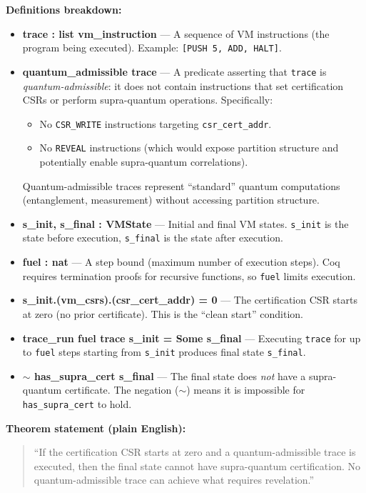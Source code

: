\textbf{Definitions breakdown:}
\begin{itemize}
    \item \textbf{trace : list vm\_instruction} — A sequence of VM instructions (the program being executed). Example: \texttt{[PUSH 5, ADD, HALT]}.

    \item \textbf{quantum\_admissible trace} — A predicate asserting that \texttt{trace} is \textit{quantum-admissible}: it does not contain instructions that set certification CSRs or perform supra-quantum operations. Specifically:
    \begin{itemize}
        \item No \texttt{CSR\_WRITE} instructions targeting \texttt{csr\_cert\_addr}.
        \item No \texttt{REVEAL} instructions (which would expose partition structure and potentially enable supra-quantum correlations).
    \end{itemize}
    Quantum-admissible traces represent ``standard'' quantum computations (entanglement, measurement) without accessing partition structure.

    \item \textbf{s\_init, s\_final : VMState} — Initial and final VM states. \texttt{s\_init} is the state before execution, \texttt{s\_final} is the state after execution.

    \item \textbf{fuel : nat} — A step bound (maximum number of execution steps). Coq requires termination proofs for recursive functions, so \texttt{fuel} limits execution.

    \item \textbf{s\_init.(vm\_csrs).(csr\_cert\_addr) = 0} — The certification CSR starts at zero (no prior certificate). This is the ``clean start'' condition.

    \item \textbf{trace\_run fuel trace s\_init = Some s\_final} — Executing \texttt{trace} for up to \texttt{fuel} steps starting from \texttt{s\_init} produces final state \texttt{s\_final}.

    \item \textbf{$\sim$ has\_supra\_cert s\_final} — The final state does \textit{not} have a supra-quantum certificate. The negation ($\sim$) means it is impossible for \texttt{has\_supra\_cert} to hold.
\end{itemize}

\textbf{Theorem statement (plain English):}
\begin{quote}
``If the certification CSR starts at zero and a quantum-admissible trace is executed, then the final state cannot have supra-quantum certification. No quantum-admissible trace can achieve what requires revelation.''
\end{quote}


